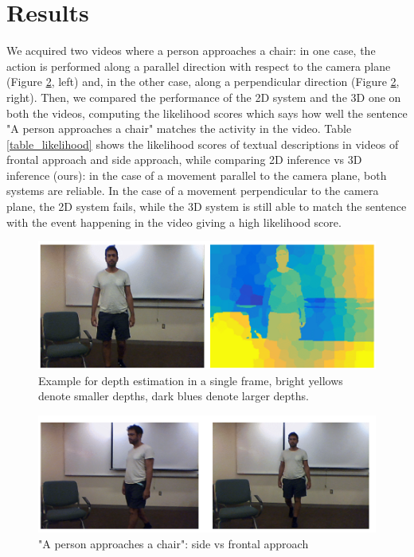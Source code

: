 \documentclass[10pt,twocolumn,letterpaper]{article}
\begin{document}
\section{Results}
We acquired two videos where a person approaches a chair: in one case, the action is performed along a parallel direction with respect to the camera plane (Figure \ref{fig_front_vs_side}, left) and, in the other case, along a perpendicular direction (Figure \ref{fig_front_vs_side}, right). Then, we compared the performance of the 2D system and the 3D one on both the videos, computing the likelihood scores which says how well the sentence "A person approaches a chair" matches the activity in the video. 
Table \ref{table_likelihood} shows the likelihood scores of textual descriptions in videos of frontal approach and side approach, while comparing 2D inference \cite{siddharth2014seeing} vs 3D inference (ours): in the case of a movement parallel to the camera plane, both systems are reliable. In the case of a movement perpendicular to the camera plane, the 2D system fails, while the 3D system is still able to match the sentence with the event happening in the video giving a high likelihood score.



\begin{figure}[ht]
\begin{center}
   \includegraphics[width=0.8\linewidth]{depth_estim_example.png}
   \end{center}
   \caption{Example for depth estimation in a single frame, bright yellows denote smaller depths, dark blues denote larger depths.}
\label{fig_depth_frame}
\end{figure}

\begin{figure}[ht]
\begin{center}
   \includegraphics[width=0.8\linewidth]{front_vs_side_approach.png}
   \end{center}
   \caption{"A person approaches a chair": side vs frontal approach}
\label{fig_front_vs_side}
\end{figure}
\end{document}
